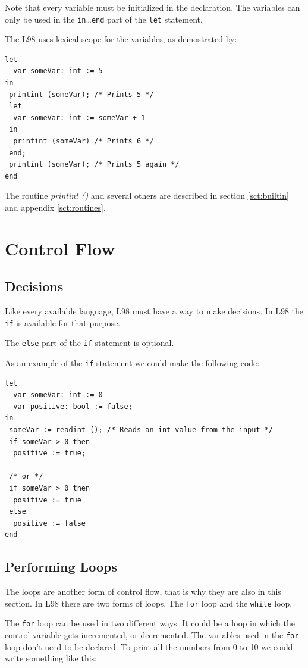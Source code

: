 \documentclass[a4paper, 11pt]{report}
\newcommand{\keyword}[1]{\texttt{#1}}
\begin{document}
Note that every variable must be initialized in the declaration. The
variables can only be used in the \keyword{in}\dots\keyword{end} part
of the \keyword{let} statement.

The L98 uses lexical scope for the variables, as demostrated by:

\begin{lstlisting}
let
  var someVar: int := 5
in
 printint (someVar); /* Prints 5 */
 let
  var someVar: int := someVar + 1
 in
  printint (someVar) /* Prints 6 */
 end;
 printint (someVar); /* Prints 5 again */
end
\end{lstlisting}

The routine \emph{printint ()} and several others are described in section \ref{sct:builtin}
and appendix \ref{sct:routines}.

\section{Control Flow}

\subsection{Decisions}
Like every available language, L98 must have a way to make
decisions. In L98 the \keyword{if} is available for that
purpose.

The \keyword{else} part of the \keyword{if} statement is
optional.

As an example of the \keyword{if} statement we could make
the following code:

\begin{lstlisting}
let
  var someVar: int := 0
  var positive: bool := false;
in
 someVar := readint (); /* Reads an int value from the input */
 if someVar > 0 then
  positive := true;

 /* or */
 if someVar > 0 then
  positive := true
 else
  positive := false
end
\end{lstlisting}

\subsection{Performing Loops}
The loops are another form of control flow, that is why they are also in
this section.
In L98 there are two forms of loops. The \keyword{for} loop and the
\keyword{while} loop.

The \keyword{for} loop can be used in two different ways. It could be
a loop in which the control variable gets incremented, or decremented.
The variables used in the \keyword{for} loop don't need to be declared.
To print all the numbers from 0 to 10 we could write something like this:
\end{document}

